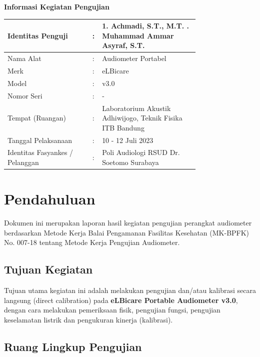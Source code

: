 \documentclass{article}
\begin{document}
	{\large \bf Informasi Kegiatan Pengujian}
	
	\begin{table}[H]
		\centering
		\begin{tabular}{p{0.35\linewidth} p{0.01\linewidth} p{0.4\linewidth}}
			Identitas Penguji & : & 1. Achmadi, S.T., M.T. \newline 2. Muhammad Ammar Asyraf, S.T.\\ \hline
			Nama Alat & : & Audiometer Portabel\\ \hline
			Merk & : & eLBicare\\ \hline
			Model & : & v3.0\\ \hline
			Nomor Seri & : & - \\ \hline
			Tempat (Ruangan) & : & Laboratorium Akustik Adhiwijogo, Teknik Fisika ITB Bandung \\ \hline
			Tanggal Pelaksanaan & : & 10 - 12 Juli 2023\\ \hline
			Identitas Fasyankes / Pelanggan & : & Poli Audiologi RSUD Dr. Soetomo Surabaya\\ \hline
		\end{tabular}
	\end{table}
	
	
	\section{Pendahuluan}

	Dokumen ini merupakan laporan hasil kegiatan pengujian perangkat audiometer berdasarkan Metode Kerja Balai Pengamanan Fasilitas Kesehatan (MK-BPFK) No. 007-18 tentang Metode Kerja Pengujian Audiometer.  

	\subsection{Tujuan Kegiatan}

	Tujuan utama kegiatan ini adalah melakukan pengujian dan/atau kalibrasi secara langsung (direct calibration) pada
	{\bf eLBicare Portable Audiometer v3.0}, dengan cara melakukan pemeriksaan fisik, pengujian fungsi, pengujian keselamatan listrik dan pengukuran
	kinerja (kalibrasi).
	
	\subsection{Ruang Lingkup Pengujian}
	
\end{document}
